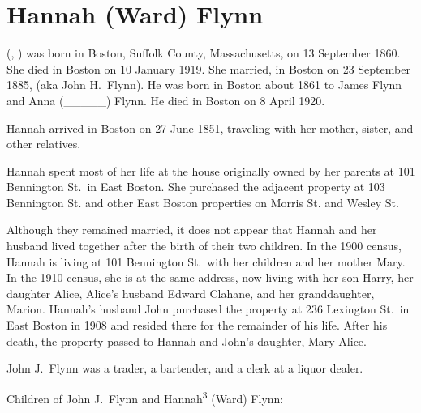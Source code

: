 \section{Hannah (Ward) Flynn}

 (, ) was born in Boston, Suffolk County, Massachusetts, on 13 September 1860.\cite{Hannah3WardBirth} She died in Boston on 10 January 1919.\cite{Hannah3WardDeath} She married, in Boston on 23 September 1885, \cite{Hannah3WardMarriage} (aka John H.\ Flynn\cite{JohnJHFlynn}). He was born in Boston about 1861 to James Flynn and Anna (\_\_\_\_\_) Flynn.\cite{Hannah3WardMarriage} He died in Boston on 8 April 1920.\cite{JohnFlynnDeath}

Hannah arrived in Boston on 27 June 1851, traveling with her mother, sister, and other relatives.\cite{Chascay}

Hannah spent most of her life at the house originally owned by her parents at 101 Bennington St.\ in East Boston.\cite{101Bennington,Census1880DavidWard,Census1910HannahWard} She purchased the adjacent property at 103 Bennington St.\cite{103BenningtonSt} and other East Boston properties on Morris St.\cite{MorrisSt} and Wesley St.\cite{WesleySt} 

Although they remained married, it does not appear that Hannah and her husband lived together after the birth of their two children.\cite{HannahWardDirectories} In the 1900 census, Hannah is living at 101 Bennington St.\ with her children and her mother Mary.\cite{Census1900HannahWard} In the 1910 census, she is at the same address, now living with her son Harry, her daughter Alice, Alice's husband Edward Clahane, and her granddaughter, Marion.\cite{Census1910HannahWard} Hannah's husband John purchased the property at 236 Lexington St.\ in East Boston in 1908 and resided there for the remainder of his life.\cite{236Lexington,JohnFlynnDeath} After his death, the property passed to Hannah and John's daughter, Mary Alice.\cite{236Lexington2}

John J.\ Flynn was a trader,\cite{Hannah3WardMarriage} a bartender,\cite{Harry4FlynnBirth} and a clerk at a liquor dealer.\cite{JohnFlynn1889,BropheyLiquors}

\begin{KidsIntro}
	Children of John J.\ Flynn and Hannah\textsuperscript{3} (Ward) Flynn:
\end{KidsIntro}

